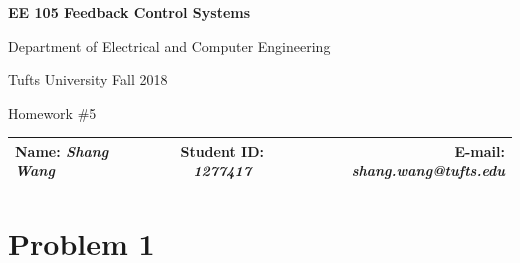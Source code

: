\documentclass[a4paper]{article}
\begin{document}
\begin{center}
\bf\Large
EE 105 Feedback Control Systems\par
Department of Electrical and Computer Engineering\par
Tufts University Fall 2018\par
Homework \#5\par   
\end{center}
\begin{table}[H]
\begin{center}
\begin{tabular*}{\textwidth}{@{\extracolsep{\fill}}lcr}
Name: {\it Shang Wang} &Student ID: {\it 1277417} &E-mail: {\it shang.wang@tufts.edu}\\
\hline
\end{tabular*}
\end{center}
\end{table}

\section{Problem 1}
\end{document}
